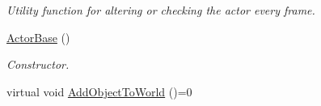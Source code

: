 \begin{DoxyCompactItemize}
\begin{DoxyCompactList}\small\item\em Utility function for altering or checking the actor every frame. \item\end{DoxyCompactList}\item 
\hyperlink{classMezzanine_1_1ActorBase_aa9cc2fce1ff708a96d4a879b87054f18}{ActorBase} ()
\begin{DoxyCompactList}\small\item\em Constructor. \item\end{DoxyCompactList}\item 
\hypertarget{classMezzanine_1_1ActorBase_a766dc0add62500689498a9c1d3f758ea}{
virtual void \hyperlink{classMezzanine_1_1ActorBase_a766dc0add62500689498a9c1d3f758ea}{AddObjectToWorld} ()=0}
\label{classMezzanine_1_1ActorBase_a766dc0add62500689498a9c1d3f758ea}


\end{DoxyCompactItemize}
